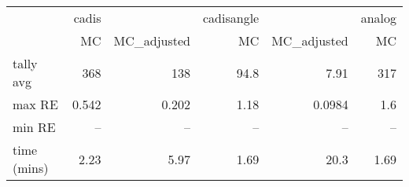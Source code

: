 \begin{tabular}{lrrrrr}
\toprule
{} & cadis &             & cadisangle &             & analog \\
{} &    MC & MC\_adjusted &         MC & MC\_adjusted &     MC \\
\midrule
tally avg   &   368 &         138 &       94.8 &        7.91 &    317 \\
max RE      & 0.542 &       0.202 &       1.18 &      0.0984 &    1.6 \\
min RE      &   -- &         -- &        -- &         -- &    -- \\
time (mins) &  2.23 &        5.97 &       1.69 &        20.3 &   1.69 \\
\bottomrule
\end{tabular}

